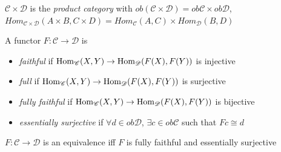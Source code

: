 \documentclass[main]{subfiles}
\begin{document}
\begin{definition}
$\mathscr C\times\mathscr D$  is the \textit{product category} with $ob(\mathscr C\times\mathscr D)=ob\mathscr C\times ob\mathscr D$, $Hom_{\mathscr C\times\mathscr D}(A\times B,C\times D)=Hom_{\mathscr C}(A,C)\times Hom_{\mathscr D}(B,D)$
\end{definition}

\begin{definition}
A functor $F:\mathscr C\to\mathscr D$ is
\begin{itemize}
\item \textit{faithful} if $\operatorname{Hom}_{\mathscr C}(X,Y)\to \operatorname{Hom}_{\mathscr D}(F(X),F(Y))$ is injective
\item \textit{full} if $\operatorname{Hom}_{\mathscr C}(X,Y)\to \operatorname{Hom}_{\mathscr D}(F(X),F(Y))$ is surjective
\item \textit{fully faithful} if $\operatorname{Hom}_{\mathscr C}(X,Y)\to \operatorname{Hom}_{\mathscr D}(F(X),F(Y))$ is bijective
\item \textit{essentially surjective} if $\forall d\in ob\mathscr D$, $\exists c\in ob\mathscr C$ such that $Fc\cong d$
\end{itemize}
\end{definition}

\begin{theorem}\label{A functor F is an equivalence iff it is fully faithful and essentially surjective}
$F:\mathscr C\to\mathscr D$ is an equivalence iff $F$ is fully faithful and essentially surjective
\end{theorem}
\end{document}

